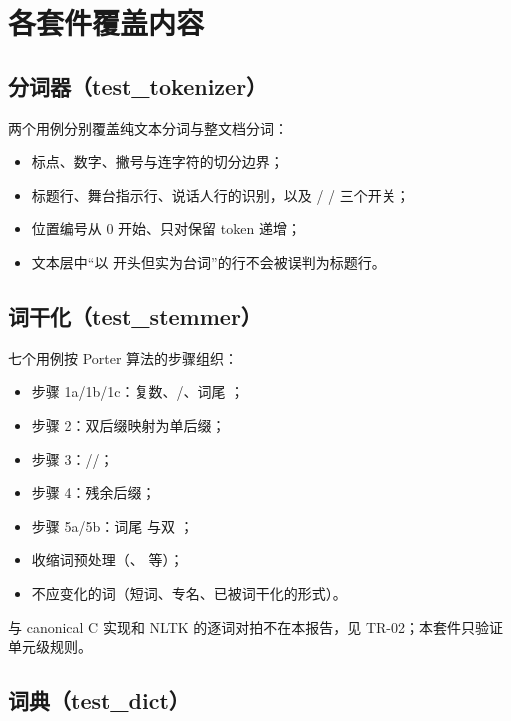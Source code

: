 \section{各套件覆盖内容}

\subsection{分词器（test\_tokenizer）}

两个用例分别覆盖纯文本分词与整文档分词：

\begin{itemize}
  \item 标点、数字、撇号与连字符的切分边界；
  \item 标题行、舞台指示行、说话人行的识别，以及  /  /  三个开关；
  \item 位置编号从 0 开始、只对保留 token 递增；
  \item 文本层中“以 \code{[} 开头但实为台词”的行不会被误判为标题行。
\end{itemize}

\subsection{词干化（test\_stemmer）}

七个用例按 Porter 算法的步骤组织：

\begin{itemize}
  \item 步骤 1a/1b/1c：复数、/、词尾 ；
  \item 步骤 2：双后缀映射为单后缀；
  \item 步骤 3：//；
  \item 步骤 4：残余后缀；
  \item 步骤 5a/5b：词尾  与双 ；
  \item 收缩词预处理（、 等）；
  \item 不应变化的词（短词、专名、已被词干化的形式）。
\end{itemize}

与 canonical C 实现和 NLTK  的逐词对拍不在本报告，见 TR-02；本套件只验证单元级规则。

\subsection{词典（test\_dict）}

